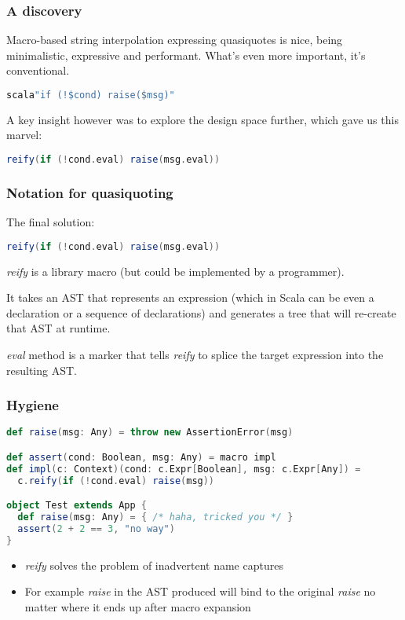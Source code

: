 \documentclass[hyperref={bookmarks=false}]{beamer}
\begin{document}
\begin{frame}[fragile]
\frametitle{A discovery}

Macro-based string interpolation expressing quasiquotes is nice, being minimalistic, expressive and performant. What's even more important, it's conventional.

\begin{lstlisting}[language=scala]
scala"if (!$cond) raise($msg)"
\end{lstlisting}

A key insight however was to explore the design space further, which gave us this marvel:

\begin{lstlisting}[language=scala]
reify(if (!cond.eval) raise(msg.eval))
\end{lstlisting}
\end{frame}

\begin{frame}[fragile]
\frametitle{Notation for quasiquoting}

The final solution:

\begin{lstlisting}[language=scala]
reify(if (!cond.eval) raise(msg.eval))
\end{lstlisting}

\emph{reify} is a library macro (but could be implemented by a programmer).

It takes an AST that represents an expression (which in Scala can be even a declaration or a sequence of declarations) and generates a tree that will re-create that AST at runtime.

\emph{eval} method is a marker that tells \emph{reify} to splice the target expression into the resulting AST.
\end{frame}

\begin{frame}[fragile]
\frametitle{Hygiene}
\begin{lstlisting}[language=scala]
def raise(msg: Any) = throw new AssertionError(msg)

def assert(cond: Boolean, msg: Any) = macro impl
def impl(c: Context)(cond: c.Expr[Boolean], msg: c.Expr[Any]) =
  c.reify(if (!cond.eval) raise(msg))

object Test extends App {
  def raise(msg: Any) = { /* haha, tricked you */ }
  assert(2 + 2 == 3, "no way")
}
\end{lstlisting}

\begin{itemize}
\item \emph{reify} solves the problem of inadvertent name captures
\item For example \emph{raise} in the AST produced will bind to the original \emph{raise} no matter where it ends up after macro expansion
\end{itemize}
\end{frame}
\end{document}
